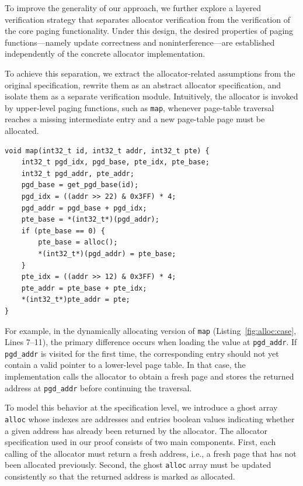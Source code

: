 
To improve the generality of our approach, we further explore a layered verification strategy that separates allocator verification from the verification of the core paging functionality. Under this design, the desired properties of paging functions---namely update correctness and noninterference---are established independently of the concrete allocator implementation.

To achieve this separation, we extract the allocator-related assumptions from the original specification, rewrite them as an abstract allocator specification, and isolate them as a separate verification module. Intuitively, the allocator is invoked by upper-level paging functions, such as \texttt{map}, whenever page-table traversal reaches a missing intermediate entry and a new page-table page must be allocated.

\begin{listing}
\caption{C-based Examples of Dynamic Allocation.}
\label{fig:alloc:case}
\begin{verbatim}
void map(int32_t id, int32_t addr, int32_t pte) {
    int32_t pgd_idx, pgd_base, pte_idx, pte_base; 
    int32_t pgd_addr, pte_addr;
    pgd_base = get_pgd_base(id);
    pgd_idx = ((addr >> 22) & 0x3FF) * 4;
    pgd_addr = pgd_base + pgd_idx;
    pte_base = *(int32_t*)(pgd_addr);
    if (pte_base == 0) {
        pte_base = alloc();
        *(int32_t*)(pgd_addr) = pte_base;
    }
    pte_idx = ((addr >> 12) & 0x3FF) * 4;
    pte_addr = pte_base + pte_idx;
    *(int32_t*)pte_addr = pte;
}
\end{verbatim}
\end{listing}

For example, in the dynamically allocating version of \texttt{map} (Listing~\autoref{fig:alloc:case}, Lines 7--11), the primary difference occurs when loading the value at \texttt{pgd\_addr}. If \texttt{pgd\_addr} is visited for the first time, the corresponding entry should not yet contain a valid pointer to a lower-level page table. In that case, the implementation calls the allocator to obtain a fresh page and stores the returned address at \texttt{pgd\_addr} before continuing the traversal.

To model this behavior at the specification level, we introduce a ghost array \texttt{alloc} whose indexes are addresses and entries boolean values indicating whether a given address has already been returned by the allocator. The allocator specification used in our proof consists of two main components. First, each calling of the allocator must return a fresh address, i.e., a fresh page that has not been allocated previously. Second, the ghost \texttt{alloc} array must be updated consistently so that the returned address is marked as allocated. 

